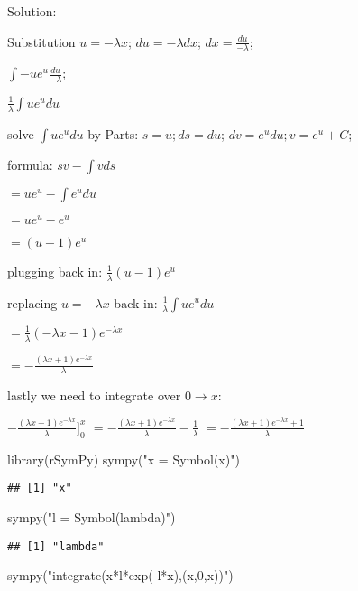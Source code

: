 \documentclass[
]{article}
\newenvironment{Shaded}{\begin{snugshade}}{\end{snugshade}}
\newcommand{\FunctionTok}[1]{\textcolor[rgb]{0.00,0.00,0.00}{#1}}
\newcommand{\NormalTok}[1]{#1}
\newcommand{\StringTok}[1]{\textcolor[rgb]{0.31,0.60,0.02}{#1}}
\begin{document}
Solution:

Substitution \(u=-\lambda x\); \(du=-\lambda dx\);
\(dx=\frac{du}{-\lambda}\);

\(\int -u e^u \frac{du}{-\lambda}\);

\(\frac{1}{\lambda}\int u e^u du\)

solve \(\int u e^u du\) by Parts: \(s=u; ds=du\); \(dv=e^udu; v=e^u+C\);

formula: \(sv-\int vds\)

\(=u e^u - \int e^u du\)

\(=u e^u - e^u\)

\(= (u-1)e^u\)

plugging back in: \(\frac{1}{\lambda}(u-1)e^u\)

replacing \(u=-\lambda x\) back in: \(\frac{1}{\lambda}\int u e^u du\)

\(=\frac{1}{\lambda}(-\lambda x - 1)e^{-\lambda x}\)

\(= -\frac{(\lambda x + 1) e^{-\lambda x}}{\lambda}\)

lastly we need to integrate over \(0\to x\):

\(-\frac{(\lambda x + 1) e^{-\lambda x}}{\lambda} ]_0^x\)
\(=-\frac{(\lambda x + 1) e^{-\lambda x}}{\lambda} - \frac{1}{\lambda}\)
\(=-\frac{(\lambda x + 1) e^{-\lambda x}+1}{\lambda}\)

\begin{Shaded}
\begin{Highlighting}[]
\FunctionTok{library}\NormalTok{(rSymPy)}
\FunctionTok{sympy}\NormalTok{(}\StringTok{"x = Symbol(\textquotesingle{}x\textquotesingle{})"}\NormalTok{)}
\end{Highlighting}
\end{Shaded}

\begin{verbatim}
## [1] "x"
\end{verbatim}

\begin{Shaded}
\begin{Highlighting}[]
\FunctionTok{sympy}\NormalTok{(}\StringTok{"l = Symbol(\textquotesingle{}lambda\textquotesingle{})"}\NormalTok{)}
\end{Highlighting}
\end{Shaded}

\begin{verbatim}
## [1] "lambda"
\end{verbatim}

\begin{Shaded}
\begin{Highlighting}[]
\FunctionTok{sympy}\NormalTok{(}\StringTok{"integrate(x*l*exp({-}l*x),(x,0,x))"}\NormalTok{)}
\end{Highlighting}
\end{Shaded}
\end{document}
